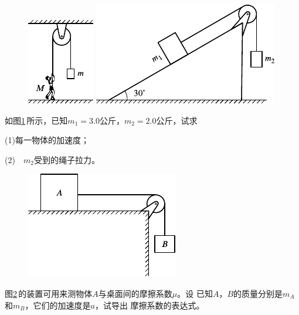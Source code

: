 \begin{exercises}
\begin{figure}[h]
  \begin{minipage}[b]{0.4\linewidth}
    \centering
    \includegraphics{figure/fig03.23}
    \caption{}
    \label{fig:03.23}
  \end{minipage}
  \begin{minipage}[b]{0.6\linewidth}
    \centering
    \includegraphics{figure/fig03.24}
    \caption{}
    \label{fig:03.24}
  \end{minipage}
  \vspace{-1.56em}
\end{figure}
\exercise 如图\ref{fig:03.24}\,所示，已知$ m _ { 1 } = 3 . 0 $公斤，$ m _ { 2 } = 2 . 0 $公斤，试求

(1)每一物体的加速度；

(2)~~$ m _ { 2 } $受到的绳子拉力。

\begin{figure}
  \centering
  \includegraphics{figure/fig03.25}
  \caption{}
  \label{fig:03.25}
\end{figure}
\exercise 图\ref{fig:03.25}\,的装置可用来测物体$ A $与桌面间的摩擦系数$ \mu $。设
已知$ A $，$ B $的质量分别是$ m_A $和$ m_B $，它们的加速度是$ a $，试导出
摩擦系数的表达式。


\end{exercises}

